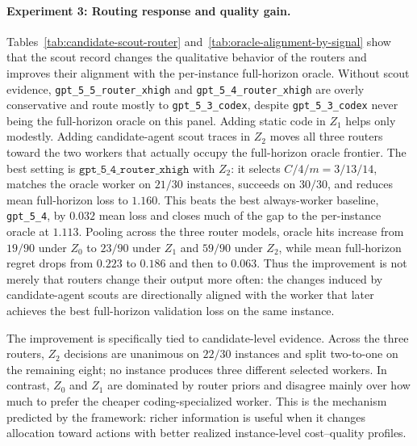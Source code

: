 \documentclass{article}
\begin{document}
\paragraph{Experiment 3: Routing response and quality gain.}
Tables~\ref{tab:candidate-scout-router} and~\ref{tab:oracle-alignment-by-signal} show that the scout record changes the qualitative behavior of the routers and improves their alignment with the per-instance full-horizon oracle.
Without scout evidence, \texttt{gpt\_5\_5\_router\_xhigh} and \texttt{gpt\_5\_4\_router\_xhigh} are overly conservative and route mostly to \texttt{gpt\_5\_3\_codex}, despite \texttt{gpt\_5\_3\_codex} never being the full-horizon oracle on this panel.
Adding static code in \(Z_1\) helps only modestly.
Adding candidate-agent scout traces in \(Z_2\) moves all three routers toward the two workers that actually occupy the full-horizon oracle frontier.
The best setting is \(\texttt{gpt\_5\_4\_router\_xhigh}\) with \(Z_2\): it selects \(C/4/m=3/13/14\), matches the oracle worker on \(21/30\) instances, succeeds on \(30/30\), and reduces mean full-horizon loss to \(1.160\).
This beats the best always-worker baseline, \texttt{gpt\_5\_4}, by \(0.032\) mean loss and closes much of the gap to the per-instance oracle at \(1.113\).
Pooling across the three router models, oracle hits increase from \(19/90\) under \(Z_0\) to \(23/90\) under \(Z_1\) and \(59/90\) under \(Z_2\), while mean full-horizon regret drops from \(0.223\) to \(0.186\) and then to \(0.063\).
Thus the improvement is not merely that routers change their output more often: the changes induced by candidate-agent scouts are directionally aligned with the worker that later achieves the best full-horizon validation loss on the same instance.

The improvement is specifically tied to candidate-level evidence.
Across the three routers, \(Z_2\) decisions are unanimous on \(22/30\) instances and split two-to-one on the remaining eight; no instance produces three different selected workers.
In contrast, \(Z_0\) and \(Z_1\) are dominated by router priors and disagree mainly over how much to prefer the cheaper coding-specialized worker.
This is the mechanism predicted by the framework: richer information is useful when it changes allocation toward actions with better realized instance-level cost--quality profiles.
\end{document}
